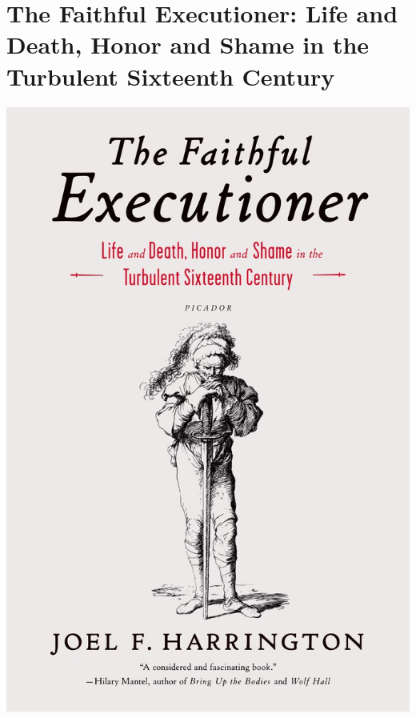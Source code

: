 \documentclass{tufte-handout}
\makeatletter
\newcommand{\varcaption}[2][0pt]{%
  \gsetlength{\@tufte@caption@vertical@offset}{-#1}%
  \gdef\@tufte@stored@varcaption{#2}%
}
\gdef\@tufte@stored@varcaption{} %
\makeatother
\begin{document}
\section*{The Faithful Executioner: Life and Death, Honor and Shame in the Turbulent Sixteenth Century}
\begin{marginfigure}[\baselineskip]
   \includegraphics[width=\linewidth]{images/faithful_executioner.jpg}
   \varcaption{\href{https://us.macmillan.com/books/9781250043610}{Publisher Link}, \href{https://www.amazon.com/Faithful-Executioner-Turbulent-Sixteenth-Century/dp/1250043611/}{Amazon Link}}
\end{marginfigure}
\end{document}
